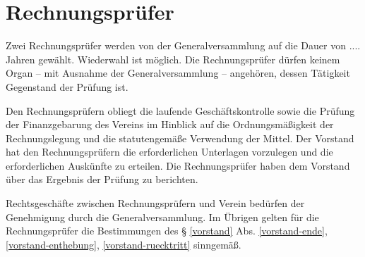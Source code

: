 \documentclass{article}
\begin{document}
\section{Rechnungsprüfer}\label{rechnungspruefung}
\begin{absatz}
    \item Zwei Rechnungsprüfer werden von der Generalversammlung auf die Dauer von
    .... Jahren gewählt. Wiederwahl ist möglich. Die Rechnungsprüfer dürfen keinem Organ – mit Ausnahme der Generalversammlung – angehören, dessen Tätigkeit Gegenstand der Prüfung ist.
    \item Den Rechnungsprüfern obliegt die laufende Geschäftskontrolle sowie die Prüfung der Finanzgebarung des Vereins im Hinblick auf die Ordnungsmäßigkeit der Rechnungslegung und die statutengemäße Verwendung der Mittel. Der Vorstand hat den Rechnungsprüfern die erforderlichen Unterlagen vorzulegen und die erforderlichen Auskünfte zu erteilen. Die Rechnungsprüfer haben dem Vorstand über das Ergebnis der Prüfung zu berichten.
    \item Rechtsgeschäfte zwischen Rechnungsprüfern und Verein bedürfen der Genehmigung durch die Generalversammlung. Im Übrigen gelten für die Rechnungsprüfer die Bestimmungen des § \ref{vorstand} Abs. \ref{vorstand-ende}, \ref{vorstand-enthebung}, \ref{vorstand-ruecktritt} sinngemäß.
\end{absatz}
\end{document}
